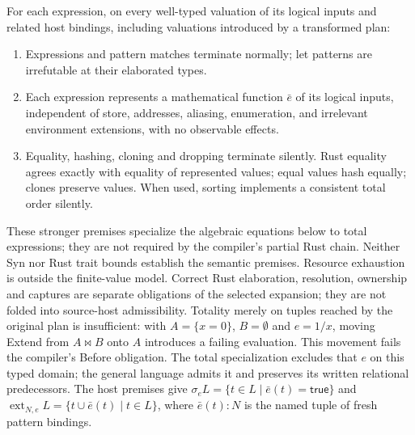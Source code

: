 \begin{definition}
\label{def:host}
For each expression, on every well-typed valuation of its logical inputs and
related host bindings, including valuations introduced by a transformed plan:
\begin{enumerate}
\item Expressions and pattern matches terminate normally; let patterns are
irrefutable at their elaborated types.
\item Each expression represents a mathematical function $\bar e$ of its
logical inputs, independent of store, addresses, aliasing, enumeration,
and irrelevant environment extensions, with no observable effects.
\item Equality, hashing, cloning and dropping terminate silently. Rust equality
agrees exactly with equality of represented values; equal values hash equally;
clones preserve values. When used, sorting implements a consistent total order silently.
\end{enumerate}
\end{definition}
These stronger premises specialize the algebraic equations below to total
expressions; they are not required by the compiler's partial Rust chain.
Neither Syn nor Rust trait bounds establish the semantic premises.
Resource exhaustion is outside the finite-value model. Correct Rust
elaboration, resolution, ownership and captures are separate obligations of the
selected expansion; they are not folded into source-host admissibility.
Totality merely on tuples reached by the original plan is insufficient: with
$A=\{x=0\}$, $B=\emptyset$ and $e=1/x$, moving Extend from $A\bowtie B$
onto $A$ introduces a failing evaluation. This movement fails the compiler's Before obligation. The total specialization excludes that $e$ on this
typed domain; the general language admits it and preserves its written
relational predecessors.
The host premises give $\sigma_eL=\{t\in L\mid\bar e(t)=\mathsf{true}\}$ and
$\operatorname{ext}_{N,e}L=\{t\cup\bar e(t)\mid t\in L\}$, where
$\bar e(t):N$ is the named tuple of fresh pattern bindings.



